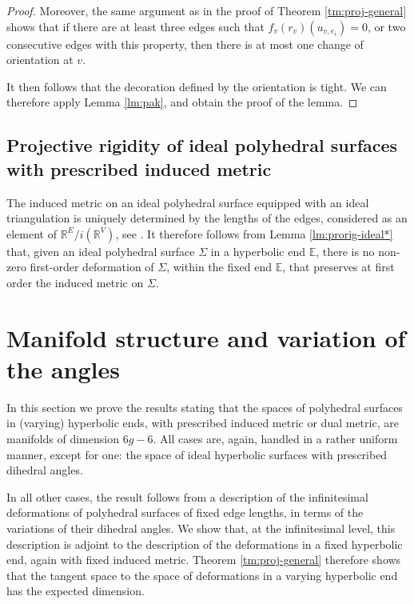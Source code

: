 \documentclass[notitlepage,twoside,a4paper]{amsart}
\theoremstyle{named}
\newcommand{\R}{{\mathbb R}}
\newcommand{\bE}{{\mathbb E}}
\begin{document}
\begin{proof}
Moreover, the same argument as in the proof of Theorem \ref{tm:proj-general} shows that if there are at least three edges such that $f_v(r_v)(u_{v, e_i})=0$, or two consecutive edges with this property, then there is at most one change of orientation at $v$.

It then follows that the decoration defined by the orientation is tight. We can therefore apply Lemma \ref{lm:pak}, and obtain the proof of the lemma.
\end{proof}

\subsection{Projective rigidity of ideal polyhedral surfaces with prescribed induced metric}
\label{ssc:prorig-induced}

The induced metric on an ideal polyhedral surface equipped with an ideal triangulation is uniquely determined by the lengths of the edges, considered as an element of $\R^E/i(\R^V)$, see \cite{penner:decorated1}. It therefore follows from Lemma \ref{lm:prorig-ideal*} that, given an ideal polyhedral surface $\Sigma$ in a hyperbolic end $\bE$, there is no non-zero first-order deformation of $\Sigma$, within the fixed end $\bE$, that preserves at first order the induced metric on $\Sigma$.


\section{Manifold structure and variation of the angles}
\label{sc:manifold}

In this section we prove the results stating that the spaces of polyhedral surfaces in (varying) hyperbolic ends, with prescribed induced metric or dual metric, are manifolds of dimension $6g-6$. All cases are, again, handled in a rather uniform manner, except for one: the space of ideal hyperbolic surfaces with prescribed dihedral angles. %

In all other cases, the result follows from a description of the infinitesimal deformations of polyhedral surfaces of fixed edge lengths, in terms of the variations of their dihedral angles. We show that, at the infinitesimal level, this description is adjoint to the description of the deformations in a fixed hyperbolic end, again with fixed induced metric. Theorem \ref{tm:proj-general} therefore shows that the tangent space to the space of deformations in a varying hyperbolic end has the expected dimension.
\end{document}
